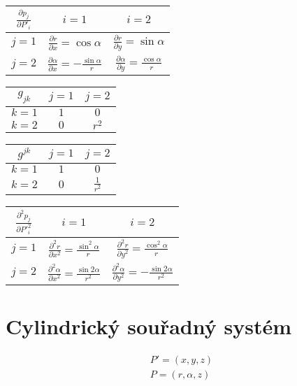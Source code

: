 \begin{tabular}{| c || c | c |}
\hline
\(\frac{\partial p_j}{\partial P'_i}\) & \(i=1\) & \(i=2\) \\
\hline
\hline
\(j=1\) & \(\frac{\partial r}{\partial x} = \cos \alpha\) & \(\frac{\partial r}{\partial y} = \sin \alpha\) \\
\hline
\(j=2\) & \(\frac{\partial \alpha}{\partial x} = -\frac{\sin \alpha}{r}\) & \(\frac{\partial \alpha}{\partial y} = \frac{\cos \alpha}{r}\) \\
\hline
\end{tabular}

\begin{tabular}{| c || c | c |}
\hline
\(g_{jk}\) & \(j=1\) & \(j=2\) \\
\hline
\hline
\(k=1\) & \(1\) & \(0\) \\
\hline
\(k=2\) & \(0\) & \(r^2\) \\
\hline
\end{tabular}

\begin{tabular}{| c || c | c |}
\hline
\(g^{jk}\) & \(j=1\) & \(j=2\) \\
\hline
\hline
\(k=1\) & \(1\) & \(0\) \\
\hline
\(k=2\) & \(0\) & \(\frac{1}{r^2}\) \\
\hline
\end{tabular}

\begin{tabular}{| c || c | c |}
\hline
\(\frac{\partial^2 p_j}{\partial P'^2_i}\) & \(i=1\) & \(i=2\) \\
\hline
\hline
\(j=1\) & \(\frac{\partial^2 r}{\partial x^2} = \frac{\sin^2 \alpha}{r}\) & \(\frac{\partial^2 r}{\partial y^2} = \frac{\cos^2 \alpha}{r}\) \\
\hline
\(j=2\) & \(\frac{\partial^2 \alpha}{\partial x^2} = \frac{\sin 2\alpha}{r^2}\) & \(\frac{\partial^2 \alpha}{\partial y^2} = -\frac{\sin 2\alpha}{r^2}\) \\
\hline
\end{tabular}


\section{Cylindrický souřadný systém}

\begin{equation}
\begin{split}
P' = (x, y, z) \\
P = (r, \alpha, z)
\end{split}
\end{equation}

